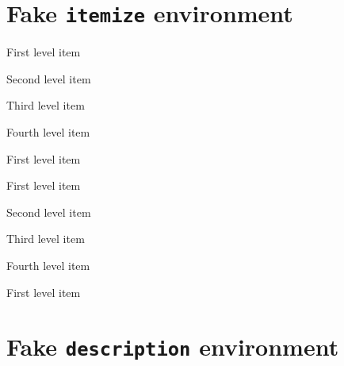 \documentclass{article}
\begin{document}
\section{Fake \texttt{itemize} environment}

\noindent\begin{minipage}[t]{0.45\linewidth}
\begin{enumext}[nosep, label=\textbullet]
  \item First level item
    \begin{enumext}[nosep,label=\normalfont\bfseries\textendash]
      \item Second level item
        \begin{enumext}[nosep,label=\textasteriskcentered]
          \item Third level item
            \begin{enumext}[nosep,label=\textperiodcentered]
               \item Fourth level item
            \end{enumext}
        \end{enumext}
    \end{enumext}
  \item First level item
\end{enumext}
\end{minipage}\hfill
\begin{minipage}[t]{0.45\linewidth}
\begin{enumext}[nosep, label=$\ast$]
  \item First level item
    \begin{enumext}[nosep,label=$\diamond$]
      \item Second level item
        \begin{enumext}[nosep,label=$\circ$]
          \item Third level item
            \begin{enumext}[nosep,label=$\star$]
               \item Fourth level item
            \end{enumext}
        \end{enumext}
    \end{enumext}
  \item First level item
\end{enumext}
\end{minipage}

\section{Fake \texttt{description} environment}
\end{document}
